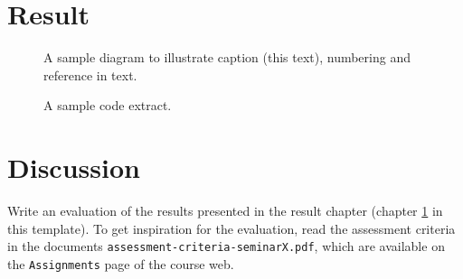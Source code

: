 \documentclass[a4paper]{scrreprt}
\begin{document}
\chapter{Result}
\label{sec:result}


\begin{figure}[h!]
  \begin{center}
    \caption{A sample diagram to illustrate caption (this text), numbering and reference in text.}
    \label{fig:diag}
  \end{center}
\end{figure}

\begin{figure}[h!]
  \begin{center}
    \caption{A sample code extract.}
    \label{fig:code}
  \end{center}
\end{figure}

\chapter{Discussion}

Write an evaluation of the results presented in the result chapter (chapter \ref{sec:result} in this template). To get inspiration for the evaluation, read the assessment criteria in the documents \texttt{assessment-criteria-seminarX.pdf}, which are available on the \texttt{Assignments} page of the course web.
\end{document}
